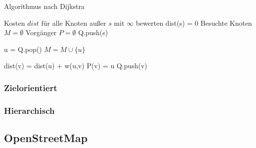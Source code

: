 \begin{algorithm}[H]
	\caption{Algorithmus nach Dijkstra}
	\label{algo:dijkstra}
	\begin{algorithmic}
		\State Kosten $dist$ für alle Knoten außer $s$ mit $\infty$ bewerten
		\State dist(s) = 0
		\State Besuchte Knoten $M = \emptyset$
		\State Vorgänger $P = \emptyset$
		\State Q.push(s)

		\State u = Q.pop()
		\State $M = M \cup \{u\}$

		\State dist(v) = dist(u) + w(u,v)
		\State P(v) = u
		\State Q.push(v)
		\EndIf
		\EndFor
		\EndWhile
		\EndFunction
	\end{algorithmic}
\end{algorithm}


\subsubsection{Zielorientiert}
\subsubsection{Hierarchisch}

\subsection{OpenStreetMap}